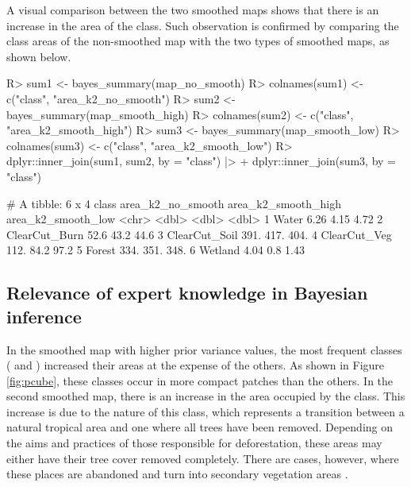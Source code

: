 \documentclass[
  shortnames]{jss}
\begin{document}
A visual comparison between the two smoothed maps shows that there is an increase in the area of the  class. Such observation is confirmed by comparing the class areas of the non-smoothed map with the two types of smoothed maps, as shown below.

\begin{CodeChunk}
\begin{CodeInput}
R> sum1 <- bayes_summary(map_no_smooth)
R> colnames(sum1) <- c("class", "area_k2_no_smooth")
R> sum2 <- bayes_summary(map_smooth_high)
R> colnames(sum2) <- c("class", "area_k2_smooth_high")
R> sum3 <- bayes_summary(map_smooth_low)
R> colnames(sum3) <- c("class", "area_k2_smooth_low")
R> dplyr::inner_join(sum1, sum2, by = "class") |>  
+   dplyr::inner_join(sum3, by = "class")
\end{CodeInput}
\begin{CodeOutput}
# A tibble: 6 x 4
  class         area_k2_no_smooth area_k2_smooth_high area_k2_smooth_low
  <chr>                     <dbl>               <dbl>              <dbl>
1 Water                      6.26                4.15               4.72
2 ClearCut_Burn             52.6                43.2               44.6 
3 ClearCut_Soil            391.                417.               404.  
4 ClearCut_Veg             112.                 84.2               97.2 
5 Forest                   334.                351.               348.  
6 Wetland                    4.04                0.8                1.43
\end{CodeOutput}
\end{CodeChunk}

\hypertarget{relevance-of-expert-knowledge-in-bayesian-inference}{%
\subsection{Relevance of expert knowledge in Bayesian inference}\label{relevance-of-expert-knowledge-in-bayesian-inference}}

In the smoothed map with higher prior variance values, the most frequent classes ( and ) increased their areas at the expense of the others. As shown in Figure \ref{fig:pcube}, these classes occur in more compact patches than the others. In the second smoothed map, there is an increase in the area occupied by the  class. This increase is due to the nature of this class, which represents a transition between a natural tropical area and one where all trees have been removed. Depending on the aims and practices of those responsible for deforestation, these areas may either have their tree cover removed completely. There are cases, however, where these places are abandoned and turn into secondary vegetation areas \cite{Uhl1988, Wang2020}.
\end{document}
